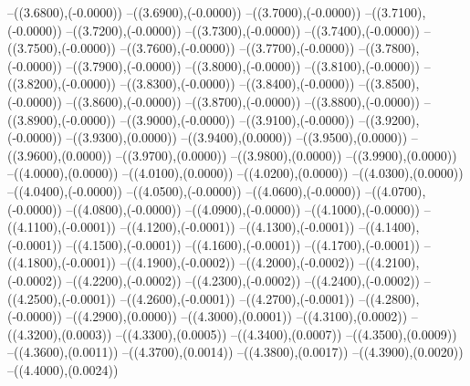 {	--({\sx*(3.6800)},{\sy*(-0.0000)})
	--({\sx*(3.6900)},{\sy*(-0.0000)})
	--({\sx*(3.7000)},{\sy*(-0.0000)})
	--({\sx*(3.7100)},{\sy*(-0.0000)})
	--({\sx*(3.7200)},{\sy*(-0.0000)})
	--({\sx*(3.7300)},{\sy*(-0.0000)})
	--({\sx*(3.7400)},{\sy*(-0.0000)})
	--({\sx*(3.7500)},{\sy*(-0.0000)})
	--({\sx*(3.7600)},{\sy*(-0.0000)})
	--({\sx*(3.7700)},{\sy*(-0.0000)})
	--({\sx*(3.7800)},{\sy*(-0.0000)})
	--({\sx*(3.7900)},{\sy*(-0.0000)})
	--({\sx*(3.8000)},{\sy*(-0.0000)})
	--({\sx*(3.8100)},{\sy*(-0.0000)})
	--({\sx*(3.8200)},{\sy*(-0.0000)})
	--({\sx*(3.8300)},{\sy*(-0.0000)})
	--({\sx*(3.8400)},{\sy*(-0.0000)})
	--({\sx*(3.8500)},{\sy*(-0.0000)})
	--({\sx*(3.8600)},{\sy*(-0.0000)})
	--({\sx*(3.8700)},{\sy*(-0.0000)})
	--({\sx*(3.8800)},{\sy*(-0.0000)})
	--({\sx*(3.8900)},{\sy*(-0.0000)})
	--({\sx*(3.9000)},{\sy*(-0.0000)})
	--({\sx*(3.9100)},{\sy*(-0.0000)})
	--({\sx*(3.9200)},{\sy*(-0.0000)})
	--({\sx*(3.9300)},{\sy*(0.0000)})
	--({\sx*(3.9400)},{\sy*(0.0000)})
	--({\sx*(3.9500)},{\sy*(0.0000)})
	--({\sx*(3.9600)},{\sy*(0.0000)})
	--({\sx*(3.9700)},{\sy*(0.0000)})
	--({\sx*(3.9800)},{\sy*(0.0000)})
	--({\sx*(3.9900)},{\sy*(0.0000)})
	--({\sx*(4.0000)},{\sy*(0.0000)})
	--({\sx*(4.0100)},{\sy*(0.0000)})
	--({\sx*(4.0200)},{\sy*(0.0000)})
	--({\sx*(4.0300)},{\sy*(0.0000)})
	--({\sx*(4.0400)},{\sy*(-0.0000)})
	--({\sx*(4.0500)},{\sy*(-0.0000)})
	--({\sx*(4.0600)},{\sy*(-0.0000)})
	--({\sx*(4.0700)},{\sy*(-0.0000)})
	--({\sx*(4.0800)},{\sy*(-0.0000)})
	--({\sx*(4.0900)},{\sy*(-0.0000)})
	--({\sx*(4.1000)},{\sy*(-0.0000)})
	--({\sx*(4.1100)},{\sy*(-0.0001)})
	--({\sx*(4.1200)},{\sy*(-0.0001)})
	--({\sx*(4.1300)},{\sy*(-0.0001)})
	--({\sx*(4.1400)},{\sy*(-0.0001)})
	--({\sx*(4.1500)},{\sy*(-0.0001)})
	--({\sx*(4.1600)},{\sy*(-0.0001)})
	--({\sx*(4.1700)},{\sy*(-0.0001)})
	--({\sx*(4.1800)},{\sy*(-0.0001)})
	--({\sx*(4.1900)},{\sy*(-0.0002)})
	--({\sx*(4.2000)},{\sy*(-0.0002)})
	--({\sx*(4.2100)},{\sy*(-0.0002)})
	--({\sx*(4.2200)},{\sy*(-0.0002)})
	--({\sx*(4.2300)},{\sy*(-0.0002)})
	--({\sx*(4.2400)},{\sy*(-0.0002)})
	--({\sx*(4.2500)},{\sy*(-0.0001)})
	--({\sx*(4.2600)},{\sy*(-0.0001)})
	--({\sx*(4.2700)},{\sy*(-0.0001)})
	--({\sx*(4.2800)},{\sy*(-0.0000)})
	--({\sx*(4.2900)},{\sy*(0.0000)})
	--({\sx*(4.3000)},{\sy*(0.0001)})
	--({\sx*(4.3100)},{\sy*(0.0002)})
	--({\sx*(4.3200)},{\sy*(0.0003)})
	--({\sx*(4.3300)},{\sy*(0.0005)})
	--({\sx*(4.3400)},{\sy*(0.0007)})
	--({\sx*(4.3500)},{\sy*(0.0009)})
	--({\sx*(4.3600)},{\sy*(0.0011)})
	--({\sx*(4.3700)},{\sy*(0.0014)})
	--({\sx*(4.3800)},{\sy*(0.0017)})
	--({\sx*(4.3900)},{\sy*(0.0020)})
	--({\sx*(4.4000)},{\sy*(0.0024)})
}
